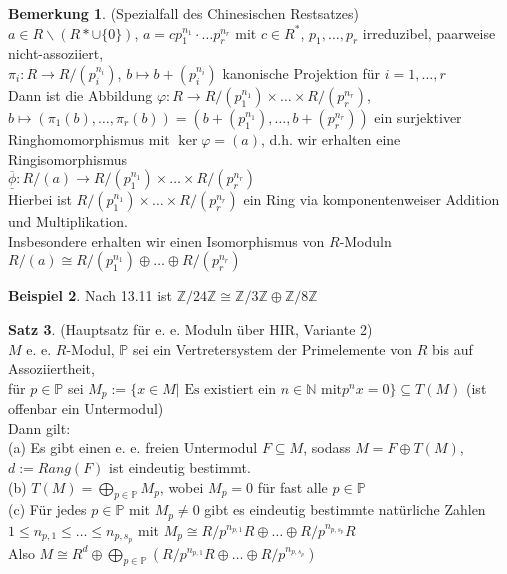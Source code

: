 \documentclass[10pt,a4paper,numbers=endperiod]{scrartcl}
\theoremstyle{definition}
\newtheorem{satz}{Satz}[section]
\newtheorem{bem}[satz]{Bemerkung}
\newtheorem{bsp}[satz]{Beispiel}
\def\NN{{\mathbb N}}
\def\ZZ{{\mathbb Z}}
\def\PP{{\mathbb P}}
\begin{document}
\begin{bem}
	(Spezialfall des Chinesischen Restsatzes)\\
	$a \in R \backslash (R* \cup \{0\})$, $a = cp_1^{n_1} \cdot \ldots p_r^{n_r}$ mit $c \in R^*$, $p_1,\ldots, p_r$ irreduzibel, paarweise nicht-assoziiert,\\
	$\pi_i: R \rightarrow R/(p_i^{n_i})$, $b \mapsto b + (p_i^{n_i})$ kanonische Projektion für $i = 1, \ldots, r$\\
	Dann ist die Abbildung $\varphi: R \rightarrow R/(p_1^{n_1}) \times \ldots \times R/(p_r^{n_r})$, $b \mapsto (\pi_1(b), \ldots, \pi_r(b)) = (b + (p_1^{n_1}), \ldots, b+ (p_r^{n_r}))$ ein surjektiver Ringhomomorphismus mit $\ker \varphi = (a)$, d.h. wir erhalten eine Ringisomorphismus\\
	$\overline{\underline{\phi}}: R/(a) \rightarrow R/(p_1^{n_1}) \times \ldots \times R/(p_r^{n_r})$\\
	Hierbei ist $R/(p_1^{n_1}) \times \ldots \times R/(p_r^{n_r})$ ein Ring via komponentenweiser Addition und Multiplikation.\\
	Insbesondere erhalten wir einen Isomorphismus von $R$-Moduln\\
	$R/(a) \cong R/(p_1^{n_1}) \oplus \ldots \oplus R/(p_r^{n_r})$
\end{bem}

\begin{bsp}
	Nach 13.11 ist $\ZZ/24\ZZ \cong \ZZ/3\ZZ \oplus \ZZ/8\ZZ$
\end{bsp}

\begin{satz}
	(Hauptsatz für e. e. Moduln über HIR, Variante 2)\\
	$M$ e. e. $R$-Modul, $\PP$ sei ein Vertretersystem der Primelemente von $R$ bis auf Assoziiertheit,\\ für $p \in \PP$ sei $M_p := \{x \in M| \text{ Es existiert ein $n \in \NN$ mit} p^nx= 0\} \subseteq T(M)$ (ist offenbar ein Untermodul)\\
	Dann gilt:\\
	(a) Es gibt einen e. e. freien Untermodul $F \subseteq M$, sodass $M = F \oplus T(M)$, $d := Rang(F)$ ist eindeutig bestimmt.\\
	(b) $T(M) = \bigoplus\limits_{p \in \PP} M_p$, wobei $M_p = 0$ für fast alle $p \in \PP$\\
	(c) Für jedes $p \in \PP$ mit $M_p \neq 0$ gibt es eindeutig bestimmte natürliche Zahlen $1 \leq n_{p,1} \leq \ldots \leq n_{p,s_p}$ mit $M_p \cong R/p^{n_{p,1}}R \oplus \ldots \oplus R/p^{n_{p,s_p}}R$\\
	Also $M \cong R^d \oplus \bigoplus\limits_{p \in \PP} (R/p^{n_{p,1}}R \oplus \ldots \oplus R/p^{n_{p,s_p}})$
\end{satz}
\end{document}
